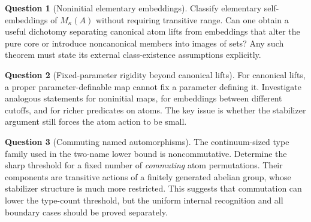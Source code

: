 \documentclass[11pt,letterpaper]{article}
\numberwithin{equation}{section}
\theoremstyle{plain}
\theoremstyle{definition}
\newtheorem{question}[question]{Question}
\theoremstyle{remark}
\begin{document}
\begin{question}[Noninitial elementary embeddings]
Classify elementary self-embeddings of $M_\kappa(A)$ without requiring transitive range. Can one obtain a useful dichotomy separating canonical atom lifts from embeddings that alter the pure core or introduce noncanonical members into images of sets? Any such theorem must state its external class-existence assumptions explicitly.
\end{question}

\begin{question}[Fixed-parameter rigidity beyond canonical lifts]
For canonical lifts, a proper parameter-definable map cannot fix a parameter defining it. Investigate analogous statements for noninitial maps, for embeddings between different cutoffs, and for richer predicates on atoms. The key issue is whether the stabilizer argument still forces the atom action to be small.
\end{question}

\begin{question}[Commuting named automorphisms]\label{nee:q:commuting}
The continuum-sized type family used in the two-name lower bound is noncommutative. Determine the sharp threshold for a fixed number of \emph{commuting} atom permutations. Their components are transitive actions of a finitely generated abelian group, whose stabilizer structure is much more restricted. This suggests that commutation can lower the type-count threshold, but the uniform internal recognition and all boundary cases should be proved separately.
\end{question}
\end{document}
